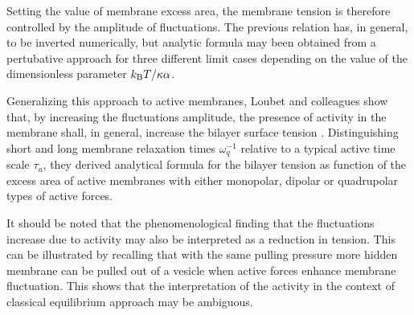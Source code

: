 \documentclass[graybox]{svmult}
\begin{document}
Setting the value of membrane excess area, the membrane tension is therefore controlled by the amplitude of fluctuations. The previous relation has, in general, to be inverted numerically, but analytic formula may been obtained from a pertubative approach for three different limit cases depending on the value of the dimensionless parameter $ k_{\rm{B}}T/\kappa\alpha$. 

Generalizing this approach to active membranes, Loubet and colleagues show that, by increasing the fluctuations amplitude, the presence of activity in the membrane shall, in general, increase the bilayer surface tension \cite{Loubet:2012}. Distinguishing short and long membrane relaxation times $\omega_q^{-1}$ relative to a typical active time scale $\tau_a$, they derived analytical formula for the bilayer tension as function of the excess area of active membranes with either monopolar, dipolar or quadrupolar types of active forces.

It should be noted that the phenomenological finding that the fluctuations increase due to activity may also be interpreted as a reduction in tension. This can be illustrated by recalling that with the same pulling pressure more hidden membrane can be pulled out of a vesicle \cite{Faris:2009} when active forces enhance membrane fluctuation. This shows that the interpretation of the activity in the context of classical equilibrium approach may be ambiguous.
  
\end{document}
